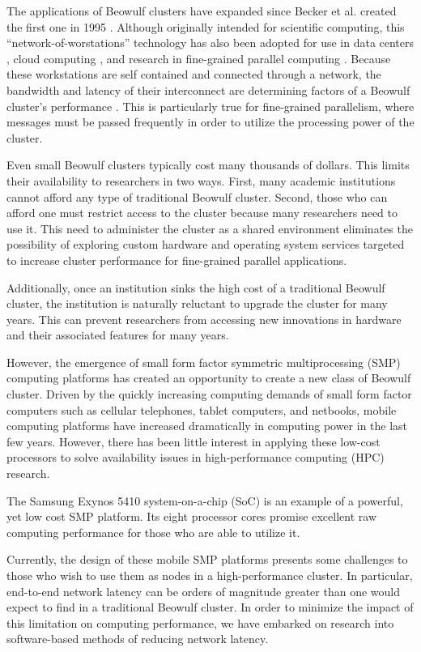 \documentclass[11pt]{book}
\begin{document}
The applications of Beowulf clusters have expanded since Becker et al. created
the first one in 1995 \cite{becker-95}. Although originally intended for
scientific computing, this ``network-of-worstations'' technology has also been
adopted for use in data centers \cite{liu-13}, cloud computing
\cite{trivedi-11}, and research in fine-grained parallel computing
\cite{aad-03}. Because these workstations are self contained and connected
through a network, the bandwidth and latency of their interconnect are
determining factors of a Beowulf cluster's performance \cite{lancaster-10}
\cite{becker-95}. This is particularly true for fine-grained parallelism, where
messages must be passed frequently in order to utilize the processing power of
the cluster.

Even small Beowulf clusters typically cost many thousands of dollars. This
limits their availability to researchers in two ways. First, many academic
institutions cannot afford any type of traditional Beowulf cluster. Second,
those who can afford one must restrict access to the cluster because many
researchers need to use it. This need to administer the cluster as a shared
environment eliminates the possibility of exploring custom hardware and
operating system services targeted to increase cluster performance for
fine-grained parallel applications.

Additionally, once an institution sinks the high cost of a traditional Beowulf
cluster, the institution is naturally reluctant to upgrade the cluster for many
years. This can prevent researchers from accessing new innovations in hardware
and their associated features for many years.

However, the emergence of small form factor symmetric multiprocessing (SMP)
computing platforms has created an opportunity to create a new class of Beowulf
cluster. Driven by the quickly increasing computing demands of small form factor
computers such as cellular telephones, tablet computers, and netbooks, mobile
computing platforms have increased dramatically in computing power in the last
few years. However, there has been little interest in applying these low-cost
processors to solve availability issues in high-performance computing (HPC)
research.

The Samsung Exynos 5410 system-on-a-chip (SoC) is an example of a powerful, yet
low cost SMP platform. Its eight processor cores promise excellent raw computing
performance for those who are able to utilize it.

Currently, the design of these mobile SMP platforms presents some challenges to
those who wish to use them as nodes in a high-performance cluster. In
particular, end-to-end network latency can be orders of magnitude greater than
one would expect to find in a traditional Beowulf cluster. In order to minimize
the impact of this limitation on computing performance, we have embarked on
research into software-based methods of reducing network latency.
\end{document}
